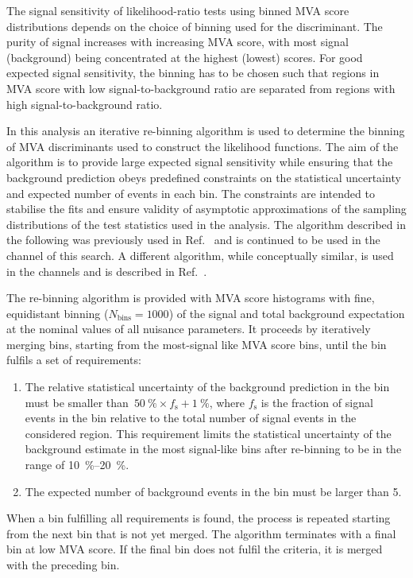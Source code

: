 The signal sensitivity of likelihood-ratio tests using binned MVA
score distributions depends on the choice of binning used for the
discriminant. The purity of signal increases with increasing MVA
score, with most signal (background) being concentrated at the highest
(lowest) scores. For good expected signal sensitivity, the binning has
to be chosen such that regions in MVA score with low
signal-to-background ratio are separated from regions with high
signal-to-background ratio.

In this analysis an iterative re-binning algorithm is used to
determine the binning of MVA discriminants used to construct the
likelihood functions. The aim of the algorithm is to provide large
expected signal sensitivity while ensuring that the background
prediction obeys predefined constraints on the statistical uncertainty
and expected number of events in each bin. The constraints are
intended to stabilise the fits and ensure validity of asymptotic
approximations of the sampling distributions of the test statistics
used in the analysis. The algorithm described in the
following was previously used in Ref.~\cite{HIGG-2016-16-witherratum}
and is continued to be used in the \hadhad channel of this search. A
different algorithm, while conceptually similar, is used in the
\lephad channels and is described in Ref.~\cite{ATLAS-CONF-2021-030}.

The re-binning algorithm is provided with MVA score histograms with
fine, equidistant binning ($N_\text{bins} = 1000$) of the signal and
total background expectation at the nominal values of all nuisance
parameters. It proceeds by iteratively merging bins, starting from the
most-signal like MVA score bins, until the bin fulfils a set of
requirements:
\begin{enumerate}

\item The relative statistical uncertainty of the background
  prediction in the bin must be smaller
  than~\mbox{$\SI{50}{\percent} \times f_\text{s} +
    \SI{1}{\percent}$}, where $f_\text{s}$ is the fraction of signal
  events in the bin relative to the total number of signal events in
  the considered region.  This requirement limits the statistical
  uncertainty of the background estimate in the most signal-like bins
  after re-binning to be in the range of \SIrange{10}{20}{\percent}.

\item The expected number of background events in the bin must be
  larger than 5.

\end{enumerate}
When a bin fulfilling all requirements is found, the process is
repeated starting from the next bin that is not yet merged. The
algorithm terminates with a final bin at low MVA score. If the final
bin does not fulfil the criteria, it is merged with the preceding
bin.

